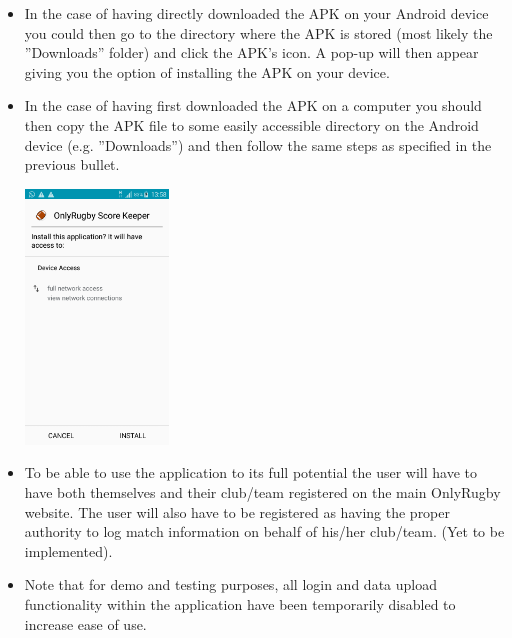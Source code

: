 \documentclass[hidelinks,a4paper,12pt]{article}
\begin{document}
\begin {itemize}
\begin{center}
	\end{center}
	\item In the case of having directly downloaded the APK on your Android device you could then go to the directory where the APK is stored (most likely the ''Downloads'' folder) and click the APK's icon. A pop-up will then appear giving you the option of installing the APK on your device.
	\item In the case of having first downloaded the APK on a computer you should then copy the APK file to some easily accessible directory on the Android device (e.g. ''Downloads'') and then follow the same steps as specified in the previous bullet.
	\begin{center}
  		 \includegraphics[width=0.3\textwidth] {./images/installation.png}\\[0.4cm]
	\end{center}
	\item To be able to use the application to its full potential the user will have to have both themselves and their club/team registered on the main OnlyRugby website. The user will also have to be registered as having the proper authority to log match information on behalf of his/her club/team. (Yet to be implemented).
	\item Note that for demo and testing purposes, all login and data upload functionality within the application have been temporarily disabled to increase ease of use.
\end{itemize}
\end{document}
